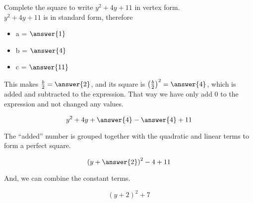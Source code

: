 \documentclass{ximera}
\author{Lee Wayand}
\begin{document}
\begin{exercise} 


Complete the square to write $y^2 + 4y + 11$ in vertex form. \\



$y^2 + 4y + 11$ is in standard form, therefore



\begin{itemize}
\item  a = $\answer{1}$ \\
\item  b = $\answer{4}$ \\
\item  c = $\answer{11}$ \\
\end{itemize}



This makes $\frac{b}{2} = \answer{2}$, and its square is $\left( \frac{b}{2} \right)^2 = \answer{4}$, which is added and subtracted to the expression.  That way we have only add $0$ to the expression and not changed any values. 


\[ y^2 + 4y + \answer{4} - \answer{4} + 11 \]



The ``added'' number is grouped together with the quadratic and linear terms to form a perfect square.



\[ \left( y + \answer{2} \right)^2  - 4 + 11 \]

And, we can combine the constant terms.



\[  ( y + 2)^2  + 7 \]



\end{exercise}
\end{document}
